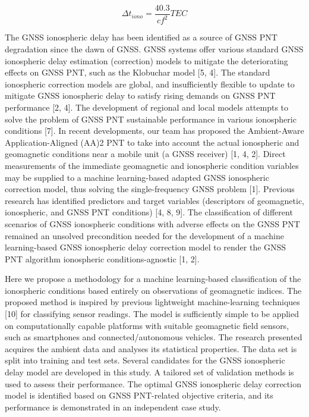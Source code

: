 \documentclass[sn-mathphys-num]{sn-jnl}%
\begin{document}
\begin{equation}
	\Delta t_{iono} = \frac{40.3}{c f^{2}} TEC
	\label{eqn:3}
\end{equation}

The GNSS ionospheric delay has been identified as a source of GNSS PNT degradation since the dawn of GNSS. GNSS systems offer various standard GNSS ionospheric delay estimation (correction) models to mitigate the deteriorating effects on GNSS PNT, such as the Klobuchar model [5, 4]. The standard ionospheric correction models are global, and insufficiently flexible to update to mitigate GNSS ionospheric delay to satisfy rising demands on GNSS PNT performance [2, 4]. The development of regional and local models attempts to solve the problem of GNSS PNT sustainable performance in various ionospheric conditions [7]. In recent developments, our team has proposed the Ambient-Aware Application-Aligned (AA)2 PNT to take into account the actual ionospheric and geomagnetic conditions near a mobile unit (a GNSS receiver) [1, 4, 2]. Direct measurements of the immediate geomagnetic and ionospheric condition variables may be supplied to a machine learning-based adapted GNSS ionospheric correction model, thus solving the single-frequency GNSS problem [1]. Previous research has identified predictors and target variables (descriptors of geomagnetic, ionospheric, and GNSS PNT conditions) [4, 8, 9]. The classification of different scenarios of GNSS ionospheric conditions with adverse effects on the GNSS PNT remained an unsolved precondition needed for the development of a machine learning-based GNSS ionospheric delay correction model to render the GNSS PNT algorithm ionospheric conditions-agnostic [1, 2].

Here we propose a methodology for a machine learning-based classification of the ionospheric conditions based entirely on observations of geomagnetic indices. The proposed method is inspired by previous lightweight machine-learning techniques [10] for classifying sensor readings. The model is sufficiently simple to be applied on computationally capable platforms with suitable geomagnetic field sensors, such as smartphones and connected/autonomous vehicles. The research presented acquires the ambient data and analyses its statistical properties. The data set is split into training and test sets. Several candidates for the GNSS ionospheric delay model are developed in this study. A tailored set of validation methods is used to assess their performance. The optimal GNSS ionospheric delay correction model is identified based on GNSS PNT-related objective criteria, and its performance is demonstrated in an independent case study.
\end{document}
